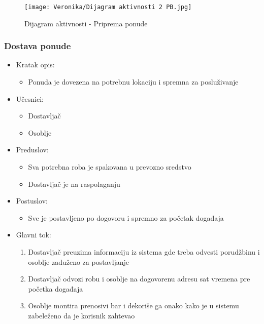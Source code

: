 \documentclass[a4paper]{article}
\begin{document}
\begin{figure}[H]
    \centering
    \texttt{[image: Veronika/Dijagram aktivnosti 2 PB.jpg]}
    \caption{Dijagram aktivnosti - Priprema ponude}
    \label{fig:PrenosiviBar}
\end{figure}


\subsubsection{Dostava ponude}

\begin{itemize}
    \item Kratak opis:
        \begin{itemize}
            \item Ponuda je dovezena na potrebnu lokaciju i spremna za posluživanje
        \end{itemize}
    \item Učesnici:
        \begin{itemize}
            \item Dostavljač
            \item Osoblje
        \end{itemize}
    \item Preduslov:
        \begin{itemize}
            \item Sva potrebna roba je spakovana u prevozno sredstvo
		    \item Dostavljač je na raspolaganju	
        \end{itemize}
    \item Postuslov:
        \begin{itemize}
            \item Sve je postavljeno po dogovoru i spremno za početak događaja
        \end{itemize}
    \item Glavni tok:
        \begin{enumerate}
            \item Dostavljač preuzima informaciju iz sistema gde treba odvesti porudžbinu i osoblje zaduženo za postavljanje
           \item Dostavljač odvozi robu i osoblje na dogovorenu adresu sat vremena pre početka događaja 
		    \item Osoblje montira prenosivi bar i dekoriše ga onako kako je u sistemu zabeleženo da je korisnik zahtevao
        \end{enumerate}
    
\end{itemize}
\end{document}
